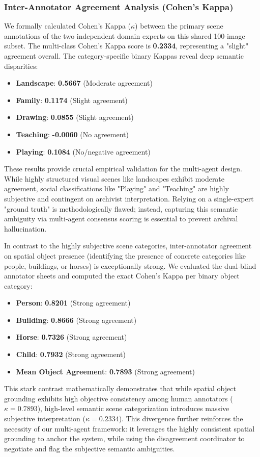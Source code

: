 \documentclass[12pt,onecolumn,a4paper]{IEEEtran}
\begin{document}
\subsubsection{Inter-Annotator Agreement Analysis (Cohen's Kappa)}
We formally calculated Cohen's Kappa ($\kappa$) between the primary scene annotations of the two independent domain experts on this shared 100-image subset. The multi-class Cohen's Kappa score is \textbf{0.2334}, representing a "slight" agreement overall. The category-specific binary Kappas reveal deep semantic disparities:
\begin{itemize}
    \item \textbf{Landscape}: \textbf{0.5667} (Moderate agreement)
    \item \textbf{Family}: \textbf{0.1174} (Slight agreement)
    \item \textbf{Drawing}: \textbf{0.0855} (Slight agreement)
    \item \textbf{Teaching}: \textbf{-0.0060} (No agreement)
    \item \textbf{Playing}: \textbf{0.1084} (No/negative agreement)
\end{itemize}
These results provide crucial empirical validation for the multi-agent design. While highly structured visual scenes like landscapes exhibit moderate agreement, social classifications like "Playing" and "Teaching" are highly subjective and contingent on archivist interpretation. Relying on a single-expert "ground truth" is methodologically flawed; instead, capturing this semantic ambiguity via multi-agent consensus scoring is essential to prevent archival hallucination.

In contrast to the highly subjective scene categories, inter-annotator agreement on spatial object presence (identifying the presence of concrete categories like people, buildings, or horses) is exceptionally strong. We evaluated the dual-blind annotator sheets and computed the exact Cohen's Kappa per binary object category:
\begin{itemize}
    \item \textbf{Person}: \textbf{0.8201} (Strong agreement)
    \item \textbf{Building}: \textbf{0.8666} (Strong agreement)
    \item \textbf{Horse}: \textbf{0.7326} (Strong agreement)
    \item \textbf{Child}: \textbf{0.7932} (Strong agreement)
    \item \textbf{Mean Object Agreement}: \textbf{0.7893} (Strong agreement)
\end{itemize}
This stark contrast mathematically demonstrates that while spatial object grounding exhibits high objective consistency among human annotators ($\kappa = 0.7893$), high-level semantic scene categorization introduces massive subjective interpretation ($\kappa = 0.2334$). This divergence further reinforces the necessity of our multi-agent framework: it leverages the highly consistent spatial grounding to anchor the system, while using the disagreement coordinator to negotiate and flag the subjective semantic ambiguities.
\end{document}
